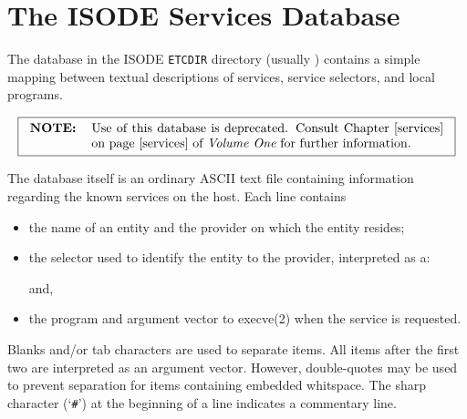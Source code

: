 
\chapter	{The ISODE Services Database}\label{isoservices}
The database  in the ISODE \verb"ETCDIR" directory
(usually )
contains a simple mapping between
textual descriptions of services, service selectors, and local programs.

\[\fbox{\begin{tabular}{lp{0.8\textwidth}}
\bf NOTE:&	Use of this database is deprecated.
		Consult Chapter~\ref{services} on page~\pageref{services}
		of \volone/ for further information.
\end{tabular}}\]

The database itself is an ordinary ASCII text file containing information
regarding the known services on the host.
Each line contains
\begin{itemize}
\item	the name of an entity and the provider on which the entity resides;

\item	the selector used to identify the entity to the provider,
	interpreted as a:
	and,

\item	the program and argument vector to \man execve(2) when the service is
	requested.
\end{itemize}
Blanks and/or tab characters are used to separate items.
All items after the first two are interpreted as an argument vector.
However, double-quotes may be used to prevent separation for items containing
embedded whitspace.
The sharp character (`\verb"#"') at the beginning of a line indicates a
commentary line.

